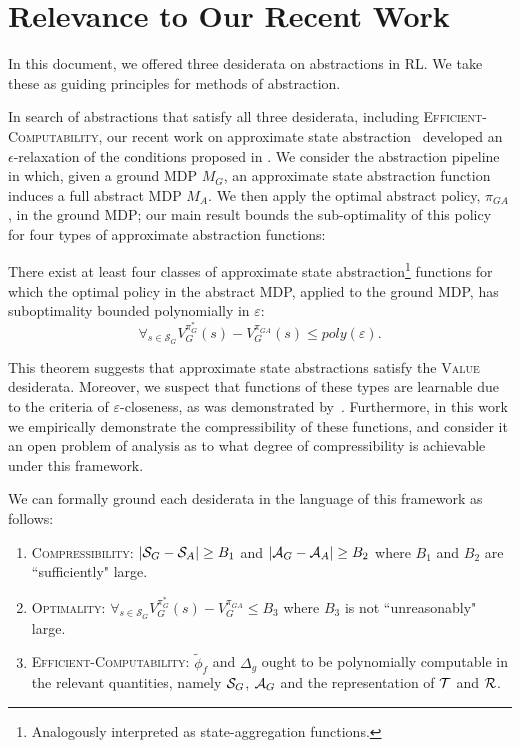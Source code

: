 \section{Relevance to Our Recent Work}

In this document, we offered three desiderata on abstractions in RL. We take these as guiding principles for methods of abstraction.

In search of abstractions that satisfy all three desiderata, including \textsc{Efficient-Computability}, our recent work on approximate state abstraction~\cite{abelhershko2016approx} developed an $\epsilon$-relaxation of the conditions proposed in \cite{li2006towards}.
We consider the abstraction pipeline in which, given a ground MDP $M_G$, an approximate state abstraction function induces a full abstract \ac{MDP} $M_A$. We then apply the optimal abstract policy, $\pi_{GA}$, in the ground MDP; our main result bounds the sub-optimality of this policy for four types of approximate abstraction functions:
\begin{thm}
There exist at least four classes of approximate state abstraction\footnote{Analogously interpreted as state-aggregation functions.} functions for which the optimal policy in the abstract \ac{MDP}, applied to the ground \ac{MDP}, has suboptimality bounded polynomially in $\varepsilon$:
\begin{equation}
\forall_{s \in \mathcal{S}_G} V_G^{\pi_G^*}(s) - V_G^{\pi_{GA}}(s) \leq poly \left (\varepsilon \right).
\end{equation}
\end{thm}

This theorem suggests that approximate state abstractions satisfy the \textsc{Value} desiderata. Moreover, we suspect that functions of these types are learnable due to the criteria of $\varepsilon$-closeness, as was demonstrated by~\cite{ortner2007logarithmic}. Furthermore, in this work we empirically demonstrate the compressibility of these functions, and consider it an open problem of analysis as to what degree of compressibility is achievable under this framework.

We can formally ground each desiderata in the language of this framework as follows:
\begin{enumerate}
\item \textsc{Compressibility}: $|\mathcal{S}_G - \mathcal{S}_A| \geq B_1$ and $|\mathcal{A}_G - \mathcal{A}_A| \geq B_2$ where $B_1$ and $B_2$ are ``sufficiently" large.

\item \textsc{Optimality}: $\forall_{s \in \mathcal{S}_G} V_G^{\pi_G^*}(s) - V_G^{\pi_{GA}} \leq B_3$ where $B_3$ is not ``unreasonably" large.

\item \textsc{Efficient-Computability}: $\widetilde{\phi}_f$ and $\Delta_g$ ought to be polynomially computable in the relevant quantities, namely $\mathcal{S}_G$, $\mathcal{A}_G$ and the representation of $\mathcal{T}$ and $\mathcal{R}$.
\end{enumerate}

